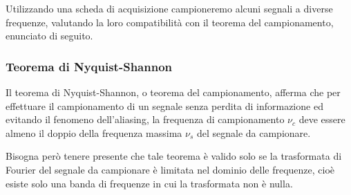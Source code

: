 Utilizzando una scheda di acquisizione campioneremo alcuni segnali a diverse frequenze, valutando la loro compatibilità con il teorema del campionamento, enunciato di seguito.

\subsubsection{Teorema di Nyquist-Shannon}

Il teorema di Nyquist-Shannon, o teorema del campionamento, afferma che per effettuare il campionamento di un segnale senza perdita di informazione ed evitando il fenomeno dell'aliasing, la frequenza di campionamento $\nu_c$ deve essere almeno il doppio della frequenza massima $\nu_s$ del segnale da campionare.

Bisogna però tenere presente che tale teorema è valido solo se la trasformata di Fourier del segnale da campionare è limitata nel dominio delle frequenze, cioè esiste solo una banda di frequenze in cui la trasformata non è nulla.

%
%
%
%
%
%
%
%
%
%
%

